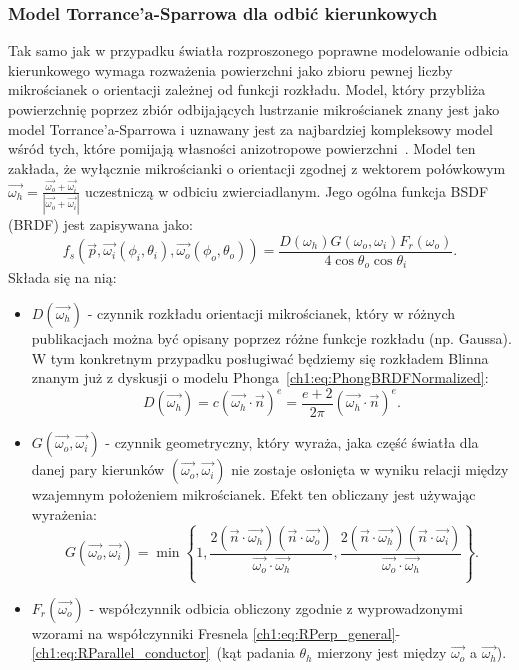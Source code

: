 \subsubsection{Model Torrance'a-Sparrowa dla odbić kierunkowych}
Tak samo jak w przypadku światła rozproszonego poprawne modelowanie odbicia kierunkowego wymaga rozważenia powierzchni jako zbioru pewnej liczby mikrościanek o orientacji zależnej od funkcji rozkładu. Model, który przybliża powierzchnię poprzez zbiór odbijających lustrzanie mikrościanek znany jest jako model Torrance'a-Sparrowa i uznawany jest za najbardziej kompleksowy model wśród tych, które pomijają własności anizotropowe powierzchni~\cite{Meister98investigationon}\cite{PBRT}. Model ten zakłada, że wyłącznie mikrościanki o orientacji zgodnej z wektorem połówkowym $\vec{\omega_h} = \frac{\vec{\omega_o} + \vec{\omega_i}}{|\vec{\omega_o} + \vec{\omega_i}|}$ uczestniczą w odbiciu zwierciadlanym.
Jego ogólna funkcja BSDF (BRDF) jest zapisywana jako:
\begin{equation}
f_s(\vec{p}, \vec{\omega_i}(\phi_i, \theta_i), \vec{\omega_o}(\phi_o, \theta_o)) = \frac{D(\omega_h)G(\omega_o, \omega_i)F_r(\omega_o)}{4\cos\theta_o\cos\theta_i}.
\label{ch1:eq:TorranceSparrowFull}
\end{equation}
Składa się na nią:
\begin{itemize}
\item[] $D(\vec{\omega_h})$ - czynnik rozkładu orientacji mikrościanek, który w różnych publikacjach można być opisany poprzez różne funkcje rozkładu (np. Gaussa). W tym konkretnym przypadku posługiwać będziemy się rozkładem Blinna znanym już z dyskusji o modelu Phonga~\eqref{ch1:eq:PhongBRDFNormalized}:
\begin{equation}
D(\vec{\omega_h}) = c(\vec{\omega_h}\cdot\vec{n})^e = \frac{e + 2}{2\pi}(\vec{\omega_h}\cdot\vec{n})^e.
\end{equation}
\item[] $G(\vec{\omega_o}, \vec{\omega_i})$ - czynnik geometryczny, który wyraża, jaka część światła dla danej pary kierunków $(\vec{\omega_o}, \vec{\omega_i})$ nie zostaje osłonięta w wyniku relacji między wzajemnym położeniem mikrościanek. Efekt ten obliczany jest używając wyrażenia:
\begin{equation}
G(\vec{\omega_o}, \vec{\omega_i}) = \min\left\lbrace 1, \frac{2(\vec{n}\cdot\vec{\omega_h})(\vec{n}\cdot\vec{\omega_o})}{\vec{\omega_o}\cdot\vec{\omega_h}}, \frac{2(\vec{n}\cdot\vec{\omega_h})(\vec{n}\cdot\vec{\omega_i})}{\vec{\omega_o}\cdot\vec{\omega_h}} \right\rbrace.
\end{equation}
\item[] $F_r(\vec{\omega_o})$ - współczynnik odbicia obliczony zgodnie z wyprowadzonymi wzorami na współczynniki Fresnela \eqref{ch1:eq:RPerp_general}-\eqref{ch1:eq:RParallel_conductor}~(kąt padania $\theta_h$ mierzony jest między $\vec{\omega_o}$ a $\vec{\omega_h}$). 
\end{itemize}
